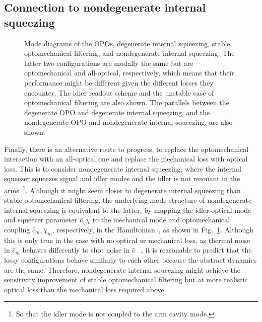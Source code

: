 \subsection{Connection to nondegenerate internal squeezing}
\label{sec:modal_equivalence}

\begin{figure}
	\centering
	\caption{ Mode diagrams of the OPOs, degenerate internal squeezing, stable optomechanical filtering, and nondegenerate internal squeezing. The latter two configurations are modally the same but are optomechanical and all-optical, respectively, which means that their performance might be different given the different losses they encounter. The idler readout scheme and the unstable case of optomechanical filtering are also shown. The parallels between the degenerate OPO and degenerate internal squeezing, and the nondegenerate OPO and nondegenerate internal squeezing, are also shown.}
	\label{fig:mode_diagram}
\end{figure}


Finally, there is an alternative route to progress, to replace the optomechanical interaction with an all-optical one and replace the mechanical loss with optical loss. This is to consider nondegenerate internal squeezing, where the internal squeezer squeezes signal and idler modes and the idler is not resonant in the arms~\footnote{So that the idler mode is not coupled to the arm cavity mode.}. 
Although it might seem closer to degenerate internal squeezing than stable optomechanical filtering, the underlying mode structure of nondegenerate internal squeezing is equivalent to the latter, by mapping the idler optical mode and squeezer parameter $\hat c, \chi$ to the mechanical mode and optomechanical coupling $\hat{c}_m, \chi_m$, respectively, in the Hamiltonian~\cite{}, as shown in Fig.~\ref{fig:mode_diagram}. Although this is only true in the case with no optical or mechanical loss, as thermal noise in $\hat{c}_m$ behaves differently to shot noise in $\hat c$~\cite{} , it is reasonable to predict that the lossy configurations behave similarly to each other because the abstract dynamics are the same. Therefore, nondegenerate internal squeezing might achieve the sensitivity improvement of stable optomechanical filtering but at more realistic optical loss than the mechanical loss required above.

